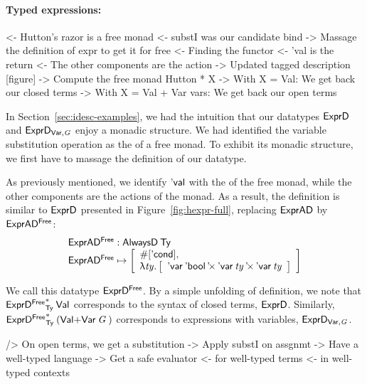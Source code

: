 \paragraph{Typed expressions:}

\begin{wstructure}
<- Hutton's razor is a free monad
    <- substI was our candidate bind
        -> Massage the definition of expr to get it for free
    <- Finding the functor
        <- 'val is the return
        <- The other components are the action
        -> Updated tagged description [figure]
    -> Compute the free monad Hutton * X
        -> With X = Val: We get back our closed terms
        -> With X = Val + Var vars: We get back our open terms
\end{wstructure}

In Section~\ref{sec:idesc-examples}, we had the intuition that our
datatypes $\HExprD$ and $\HExprVarD{\V{G}}$ enjoy a monadic
structure. We had identified the variable substitution operation as
the \bind of a free monad. To exhibit its monadic structure, we first
have to massage the definition of our datatype.

As previously mentioned, we identify $\SYMBEval$ with the \return of
the free monad, while the other components are the actions of the
monad. As a result, the definition is similar to $\HExprD$ presented
in Figure~\ref{fig:hexpr-full}, replacing $\HExprAD$ by
$\HExprAFreeD$:
%
\[\stk{
\HExprAFreeD : \ATagIDesc{\Ty} \\
\HExprAFreeD \mapsto \bigRedBracket{
                 \begin{array}{l}
                   \EnumT{\sqr{\SYMBEcond}} \red{,} \\
                   \LAM{\V{ty}}
                   \bigRedBracket{
                   \begin{array}{l}
                   \DProd{\DVar{\Ebool}}{\DProd{\DVar{\V{ty}}}{\DVar{\V{ty}}}}
                   \end{array}
                   }
                 \end{array}
                 }
}\]

We call this datatype $\HExprFreeD$. By a simple unfolding of
definition, we note that $\FreeIMonad{\HExprFreeD}{\Ty}{\SYMBVal}$
corresponds to the syntax of closed terms, $\HExprD$. Similarly,
$\FreeIMonad{\HExprFreeD}{\Ty}{(\SUM{\SYMBVal}{\Var{\V{G}}{}})}$
corresponds to expressions with variables, $\HExprVarD{\V{G}}$.

\begin{wstructure}
    /> On open terms, we get a substitution
        -> Apply substI on assgnmt
            -> Have a well-typed language
            -> Get a safe evaluator 
                <- for well-typed terms 
                <- in well-typed contexts
\end{wstructure}

